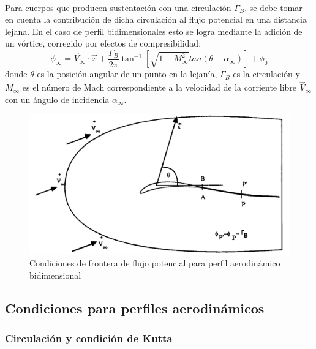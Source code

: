 \documentclass[letterpaper, openright, 12pt]{book}
\begin{document}
    \paragraph*{}
        Para cuerpos que producen sustentación con una circulación $\Gamma_{B}$,
        se debe tomar en cuenta la contribución de dicha circulación al flujo
        potencial en una distancia lejana. En el caso de perfil bidimensionales
        esto se logra mediante la adición de un vórtice, corregido por efectos
        de compresibilidad:
        \begin{equation}
            \phi_{\infty} = \vec{V}_{\infty} \cdot \vec{x}
                            + \frac{\Gamma_B}{2 \pi} \tan^{-1}
                                \left[ \sqrt{1-M_{\infty}^{2}}
                                tan(\theta - \alpha_{\infty}) \right] + \phi_{0}
        \end{equation}
        donde $\theta$ es la posición angular de un punto en la lejanía,
        $\Gamma_B$ es la circulación y $M_\infty$ es el número de Mach
        correspondiente a la velocidad de la corriente libre $\vec{V}_\infty$
        con un ángulo de incidencia $\alpha_{\infty}$.

        \begin{figure}[htbp!]
            \centering
            \includegraphics[width=115mm]{./Imagenes/circulacion_phi}
            \caption[Condiciones de frontera de flujo potencial]{Condiciones de
                frontera de flujo potencial para perfil aerodinámico
                bidimensional\cite{potential_flow}}
            \label{phi_circulacion_malla}
        \end{figure}

    \subsection{Condiciones para perfiles aerodinámicos}
    \subsubsection{Circulación y condición de Kutta}
\end{document}
